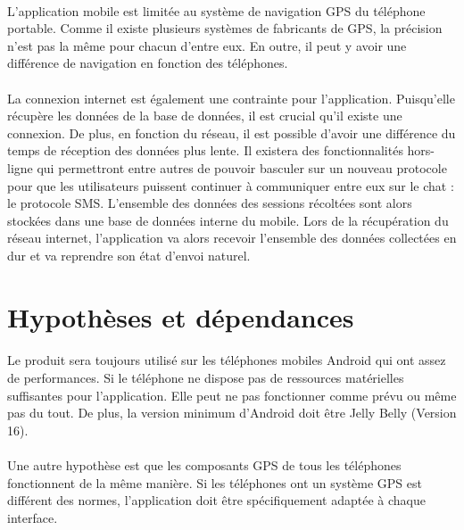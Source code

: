 \documentclass[titlepage, 12pt]{report}
\begin{document}
\paragraph{}L'application mobile est limitée au système de navigation GPS du téléphone portable. Comme il existe plusieurs systèmes de fabricants de GPS, la précision n'est pas la même pour chacun d'entre eux. En outre, il peut y avoir une différence de navigation en fonction des téléphones.

\paragraph{}La connexion internet est également une contrainte pour l'application. Puisqu'elle récupère les données de la base de données, il est crucial qu'il existe une connexion. De plus, en fonction du réseau, il est possible d'avoir une différence du temps de réception des données plus lente.
Il existera des fonctionnalités hors-ligne qui permettront entre autres de pouvoir basculer sur un nouveau protocole pour que les utilisateurs puissent continuer à communiquer entre eux sur le chat : le protocole SMS. L'ensemble des données des sessions récoltées sont alors stockées dans une base de données interne du mobile. Lors de la récupération du réseau internet, l'application va alors recevoir l'ensemble des données collectées en dur et va reprendre son état d'envoi naturel.

\section{Hypothèses et dépendances}

\paragraph{}Le produit sera toujours utilisé sur les téléphones mobiles Android qui ont assez de performances. Si le téléphone ne dispose pas de ressources matérielles suffisantes pour l'application. Elle peut ne pas fonctionner comme prévu ou même pas du tout.
De plus, la version minimum d'Android doit être Jelly Belly (Version 16). 

\paragraph{}Une autre hypothèse est que les composants GPS de tous les téléphones fonctionnent de la même manière. Si les téléphones ont un système GPS est différent des normes, l'application doit être spécifiquement adaptée à chaque interface.
\end{document}
